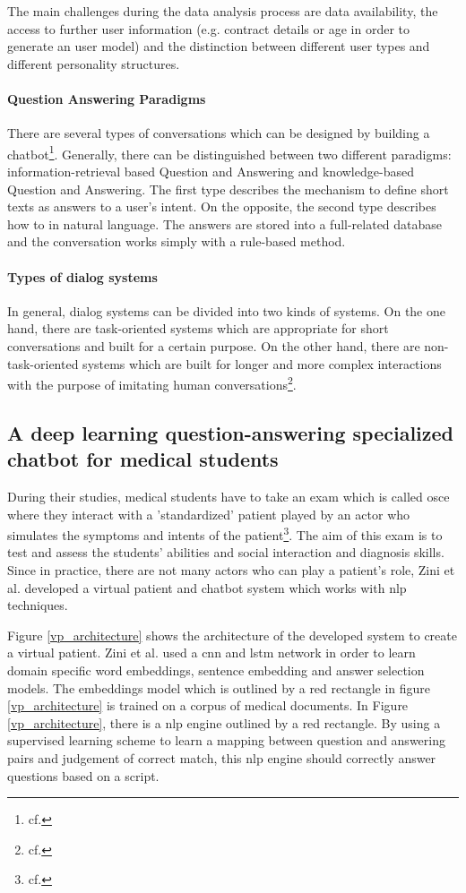 The main challenges during the data analysis process are data availability, the access to further user information (e.g. contract details or age in order to generate an user model) and the distinction between different user types and different personality structures.

\paragraph{Question Answering Paradigms}
There are several types of conversations which can be designed by building a chatbot\footnote{cf.\autocite{akhtar}}. Generally, there can be distinguished between two different paradigms: information-retrieval based Question and Answering and knowledge-based Question and Answering. The first type describes the mechanism to define short texts as answers to a user's intent. On the opposite, the second type describes how to in natural language. The answers are stored into a full-related database and the conversation works simply with a rule-based method.
\paragraph{Types of dialog systems}
In general, dialog systems can be divided into two kinds of systems. On the one hand, there are task-oriented systems which are appropriate for short conversations and built for a certain purpose. On the other hand, there are non-task-oriented systems which are built for longer and more complex interactions with the purpose of imitating human conversations\footnote{cf.\autocite{akhtar}}.

\subsection{A deep learning question-answering specialized chatbot for medical students}
During their studies, medical students have to take an exam which is called \ac{osce} where they interact with a 'standardized' patient played by an actor who simulates the symptoms and intents of the patient\footnote{cf.\autocite{zini}}. The aim of this exam is to test and assess the students' abilities and social interaction and diagnosis skills.
Since in practice, there are not many actors who can play a patient's role, Zini et al. developed a virtual patient and chatbot system which works with \ac{nlp} techniques.

Figure \ref{vp_architecture} shows the architecture of the developed system to create a virtual patient. Zini et al. used a \ac{cnn} and \ac{lstm} network in order to learn domain specific word embeddings, sentence embedding and answer selection models.
The embeddings model which is outlined by a red rectangle in figure \ref{vp_architecture} is trained on a corpus of medical documents.
In Figure \ref{vp_architecture}, there is a \ac{nlp} engine outlined by a red rectangle. By using a supervised learning scheme to learn a mapping between question and answering pairs and judgement of correct match, this \ac{nlp} engine should correctly answer questions based on a script.

